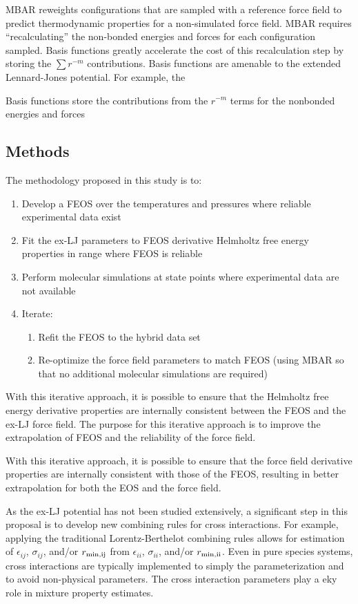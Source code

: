 \documentclass[11pt,a4paper]{article}
\begin{document}
MBAR reweights configurations that are sampled with a reference force field to predict thermodynamic properties for a non-simulated force field. MBAR requires ``recalculating'' the non-bonded energies and forces for each configuration sampled. Basis functions greatly accelerate the cost of this recalculation step by storing the $\sum r^{-m}$ contributions. Basis functions are amenable to the extended Lennard-Jones potential. For example, the 

Basis functions store the contributions from the $r^{-m}$ terms for the nonbonded energies and forces
  
\subsection{Methods}
  
  
  
The methodology proposed in this study is to:
\begin{enumerate}
	\item Develop a FEOS over the temperatures and pressures where reliable experimental data exist
	\item Fit the ex-LJ parameters to FEOS derivative Helmholtz free energy properties in range where FEOS is reliable
	\item Perform molecular simulations at state points where experimental data are not available
	\item Iterate:
	\begin{enumerate}
		\item Refit the FEOS to the hybrid data set
		\item Re-optimize the force field parameters to match FEOS (using MBAR so that no additional molecular simulations are required)
	\end{enumerate}
\end{enumerate}

With this iterative approach, it is possible to ensure that the Helmholtz free energy derivative properties are internally consistent between the FEOS and the ex-LJ force field. The purpose for this iterative approach is to improve the extrapolation of FEOS and the reliability of the force field.

With this iterative approach, it is possible to ensure that the force field derivative properties are internally consistent with those of the FEOS, resulting in better extrapolation for both the EOS and the force field. 

As the ex-LJ potential has not been studied extensively, a significant step in this proposal is to develop new combining rules for cross interactions. For example, applying the traditional Lorentz-Berthelot combining rules allows for estimation of $\epsilon_{ij}$, $\sigma_{ij}$, and/or $r_{\rm min,ij}$ from $\epsilon_{ii}$, $\sigma_{ii}$, and/or $r_{\rm min,ii}$. Even in pure species systems, cross interactions are typically implemented to simply the parameterization and to avoid non-physical parameters. The cross interaction parameters play a eky role in mixture property estimates.  
\end{document}
